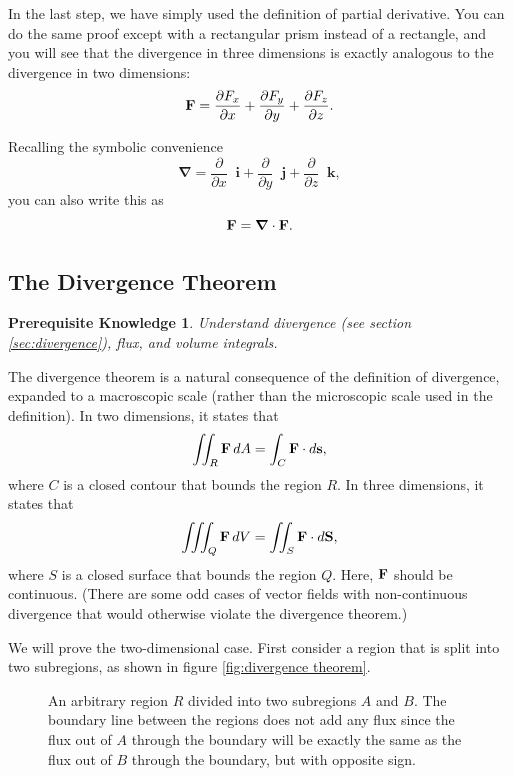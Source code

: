 \documentclass{myarticle}
\let\div\relax %
\DeclareMathOperator{\div}{div}
\renewcommand{\vec}[1]{\mathbf{#1}}
\newcommand{\unitvector}[1]{
  \mathop{}\!\vec{#1}
}
\newcommand{\ih}{\unitvector{i}}
\newcommand{\jh}{\unitvector{j}}
\newcommand{\kh}{\unitvector{k}}
\newcommand{\del}{\boldsymbol{\nabla}}
\theoremstyle{nospace}
\newtheorem*{oldprereq}{Prerequisite Knowledge}
\newenvironment{prereq}
{\begin{mdframed}\begin{oldprereq}}
    {\end{oldprereq}\end{mdframed}}
\newtheorem{old series theorem}{Theorem}
\newenvironment{series theorem}
{\begin{mdframed}\begin{old series theorem}}
    {\end{old series theorem}\end{mdframed}}
\begin{document}
In the last step, we have simply used the definition of partial
derivative. You can do the same proof except with a rectangular prism
instead of a rectangle, and you will see that the divergence in three
dimensions is exactly analogous to the divergence in two dimensions:
\[
  \div \vec{F} =
  \frac{\partial F_x}{\partial x} +
  \frac{\partial F_y}{\partial y} +
  \frac{\partial F_z}{\partial z}.
\]

Recalling the symbolic convenience
\[
  \del =
  \frac{\partial}{\partial x} \ih +
  \frac{\partial}{\partial y} \jh +
  \frac{\partial}{\partial z} \kh,
\]
you can also write this as
\[
  \div \vec{F} = \del \cdot \vec{F}.
\]

\subsection{The Divergence Theorem}
\label{sec:divergence theorem}

\begin{prereq}
  Understand divergence (see section \ref{sec:divergence}), flux, and
  volume integrals.
\end{prereq}

The divergence theorem is a natural consequence of the definition of
divergence, expanded to a macroscopic scale (rather than the
microscopic scale used in the definition). In two dimensions, it
states that
\[
  \iint_R \div \vec{F} \,dA = \int_C \vec{F} \cdot d\vec{s},
\]
where $C$ is a closed contour that bounds the region $R$. In three
dimensions, it states that
\[
  \iiint_Q \div \vec{F} \,dV = \iint_S \vec{F} \cdot d\vec{S},
\]
where $S$ is a closed surface that bounds the region $Q$. Here,
$\div \vec{F}$ should be continuous. (There are some odd cases of
vector fields with non-continuous divergence that would otherwise
violate the divergence theorem.)

We will prove the two-dimensional case. First consider a region that
is split into two subregions, as shown in figure \ref{fig:divergence
  theorem}.

\begin{figure}[htb!] \centering
  \caption{An arbitrary region $R$ divided into two subregions $A$ and
    $B$. The boundary line between the regions does not add any flux
    since the flux out of $A$ through the boundary will be exactly the
    same as the flux out of $B$ through the boundary, but with
    opposite sign.}
  \label{fig:divergence theorem}
\end{figure}
\end{document}
